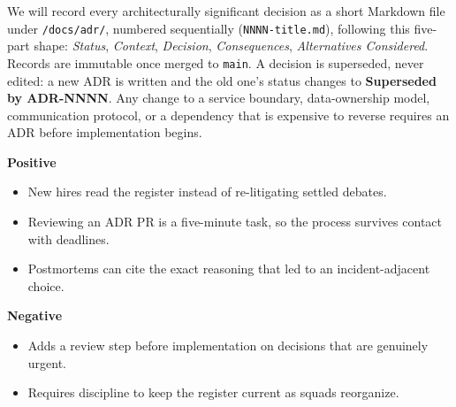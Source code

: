 \documentclass[10pt]{article}
\begin{document}
\begin{decbox}
We will record every architecturally significant decision as a short Markdown file under \texttt{/docs/adr/}, numbered sequentially (\texttt{NNNN-title.md}), following this five-part shape: \textit{Status}, \textit{Context}, \textit{Decision}, \textit{Consequences}, \textit{Alternatives Considered}. Records are immutable once merged to \texttt{main}. A decision is superseded, never edited: a new ADR is written and the old one's status changes to \textbf{Superseded by ADR-NNNN}. Any change to a service boundary, data-ownership model, communication protocol, or a dependency that is expensive to reverse requires an ADR before implementation begins.
\end{decbox}

\begin{consbox}
\noindent
\begin{minipage}[t]{0.48\linewidth}
\textbf{\textcolor{adrgreen}{Positive}}
\begin{itemize}
\item[\textcolor{adrgreen}{\faCheckCircle}] New hires read the register instead of re-litigating settled debates.
\item[\textcolor{adrgreen}{\faCheckCircle}] Reviewing an ADR PR is a five-minute task, so the process survives contact with deadlines.
\item[\textcolor{adrgreen}{\faCheckCircle}] Postmortems can cite the exact reasoning that led to an incident-adjacent choice.
\end{itemize}
\end{minipage}\hfill
\begin{minipage}[t]{0.48\linewidth}
\textbf{\textcolor{adrred}{Negative}}
\begin{itemize}
\item[\textcolor{adrred}{\faTimesCircle}] Adds a review step before implementation on decisions that are genuinely urgent.
\item[\textcolor{adrred}{\faTimesCircle}] Requires discipline to keep the register current as squads reorganize.
\end{itemize}
\end{minipage}
\end{consbox}
\end{document}
